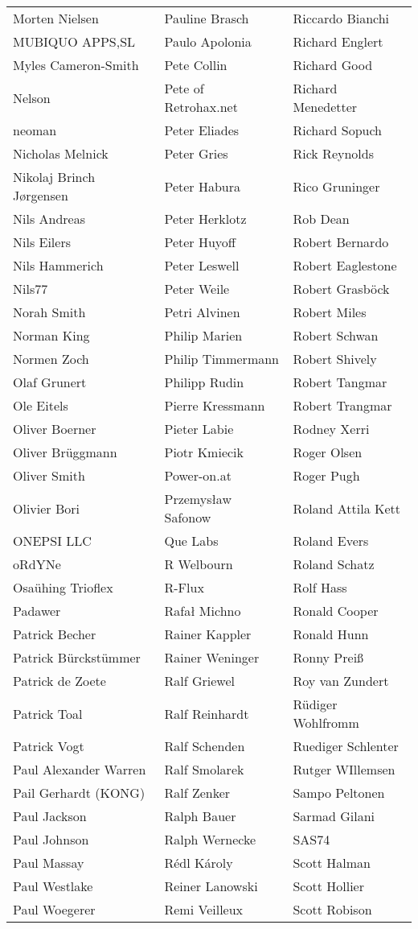 \begin{tabular}{p{4.5cm}p{4.5cm}p{4.5cm}}
Morten Nielsen & Pauline Brasch & Riccardo Bianchi \\
MUBIQUO APPS,SL & Paulo Apolonia & Richard Englert \\
Myles Cameron-Smith & Pete Collin & Richard Good \\
Nelson & Pete of Retrohax.net & Richard Menedetter \\
neoman & Peter Eliades & Richard Sopuch \\
Nicholas Melnick & Peter Gries & Rick Reynolds \\
Nikolaj Brinch Jørgensen & Peter Habura & Rico Gruninger \\
Nils Andreas & Peter Herklotz & Rob Dean \\
Nils Eilers & Peter Huyoff & Robert Bernardo \\
Nils Hammerich & Peter Leswell & Robert Eaglestone \\
Nils77 & Peter Weile & Robert Grasböck \\
Norah Smith & Petri Alvinen & Robert Miles \\
Norman King & Philip Marien & Robert Schwan \\
Normen Zoch & Philip Timmermann & Robert Shively \\
Olaf Grunert & Philipp Rudin & Robert Tangmar \\
Ole Eitels & Pierre Kressmann & Robert Trangmar \\
Oliver Boerner & Pieter Labie & Rodney Xerri \\
Oliver Brüggmann & Piotr Kmiecik & Roger Olsen \\
Oliver Smith & Power-on.at & Roger Pugh \\
Olivier Bori & Przemysław Safonow & Roland Attila Kett \\
ONEPSI LLC & Que Labs & Roland Evers \\
oRdYNe & R Welbourn & Roland Schatz \\
Osaühing Trioflex & R-Flux & Rolf Hass \\
Padawer & Rafał Michno & Ronald Cooper \\
Patrick Becher & Rainer Kappler & Ronald Hunn \\
Patrick Bürckstümmer & Rainer Weninger & Ronny Preiß \\
Patrick de Zoete & Ralf Griewel & Roy van Zundert \\
Patrick Toal & Ralf Reinhardt & Rüdiger Wohlfromm \\
Patrick Vogt & Ralf Schenden & Ruediger Schlenter \\
Paul Alexander Warren & Ralf Smolarek & Rutger WIllemsen \\
Pail Gerhardt (KONG) & Ralf Zenker & Sampo Peltonen \\
Paul Jackson & Ralph Bauer & Sarmad Gilani \\
Paul Johnson & Ralph Wernecke & SAS74 \\
Paul Massay & Rédl Károly & Scott Halman \\
Paul Westlake & Reiner Lanowski & Scott Hollier \\
Paul Woegerer & Remi Veilleux & Scott Robison \\
\end{tabular}
